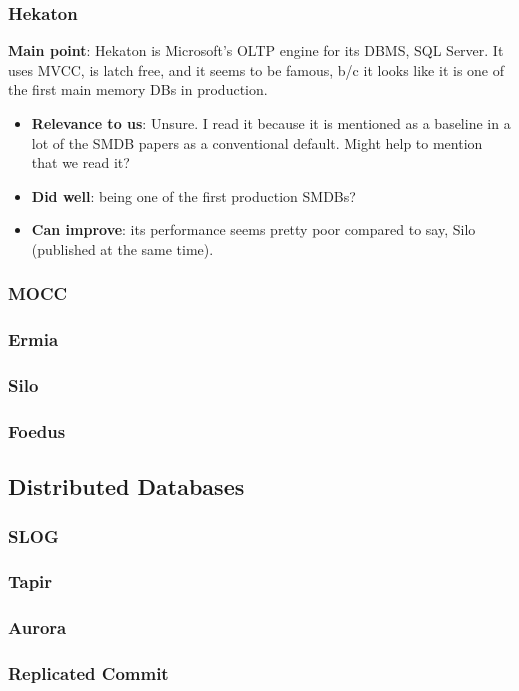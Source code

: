 \subsubsection{Hekaton}
\textbf{Main point}: Hekaton\cite{hekaton} is Microsoft's OLTP engine for its DBMS, SQL Server. It uses MVCC, is latch free, and it seems to be famous, b/c it looks like it is one of the first main memory DBs in production.
\begin{itemize}
    \item \textbf{Relevance to us}: Unsure. I read it because it is mentioned as a baseline in a lot of the SMDB papers as a conventional default. Might help to mention that we read it?
    \item \textbf{Did well}: being one of the first production SMDBs?
    \item \textbf{Can improve}: its performance seems pretty poor compared to say, Silo (published at the same time).
\end{itemize}

\subsubsection{MOCC\cite{mocc}}

\subsubsection{Ermia\cite{ermia}}
\subsubsection{Silo\cite{silo}}
\subsubsection{Foedus}
\cite{foedus}

\subsection{Distributed Databases}
\subsubsection{SLOG\cite{slog}}
\subsubsection{Tapir\cite{tapir}}
\subsubsection{Aurora}
\cite{aurora}
\subsubsection{Replicated Commit}
\cite{replicatedcommit}
